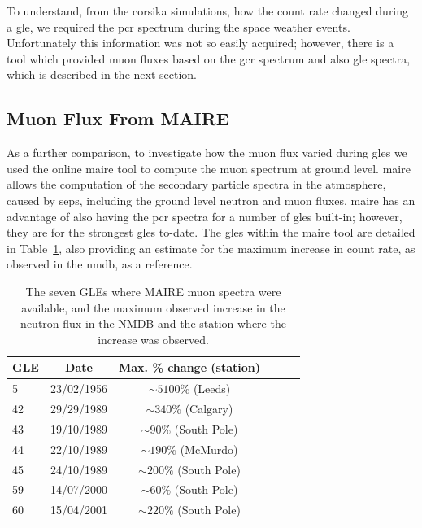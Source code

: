 To understand, from the \gls{corsika} simulations, how the count rate changed during a \gls{gle}, we required the \gls{pcr} spectrum during the space weather events. Unfortunately this information was not so easily acquired; however, there is a tool which provided muon fluxes based on the \gls{gcr} spectrum and also \gls{gle} spectra, which is described in the next section.



\subsection{Muon Flux From MAIRE}\label{sec:MAIRE_flux}

As a further comparison, to investigate how the muon flux varied during \glspl{gle} we used the online \gls{maire} tool to compute the muon spectrum at ground level. \gls{maire} allows the computation of the secondary particle spectra in the atmosphere, caused by \glspl{sep}, including the ground level neutron and muon fluxes. \gls{maire} has an advantage of also having the \gls{pcr} spectra for a number of \glspl{gle} built-in; however, they are for the strongest \glspl{gle} to-date. The \glspl{gle} within the \gls{maire} tool are detailed in Table~\ref{tab:MAIRE_GLEs}, also providing an estimate for the maximum increase in count rate, as observed in the \gls{nmdb}, as a reference.

\begin{table}[ht!]
	\begin{center}
		\caption{The seven GLEs where MAIRE muon spectra were available, and the maximum observed increase in the neutron flux in the NMDB and the station where the increase was observed.}
		\label{tab:MAIRE_GLEs}
		\begin{tabular}{l c c c c c}
			\hline
			{\bf GLE} & {\bf Date} & {\bf Max. \% change (station)} \\
			\hline
			5  & 23/02/1956 & $\sim 5100\%$ (Leeds) \\
			42 & 29/29/1989 & $\sim 340\%$ (Calgary) \\
			43 & 19/10/1989 & $\sim 90\%$ (South Pole) \\
			44 & 22/10/1989 & $\sim 190\%$ (McMurdo) \\
			45 & 24/10/1989 & $\sim 200\%$ (South Pole) \\
			59 & 14/07/2000 & $\sim 60\%$ (South Pole) \\
			60 & 15/04/2001 & $\sim 220\%$ (South Pole) \\
			\hline
		\end{tabular}
	\end{center}
\end{table}

